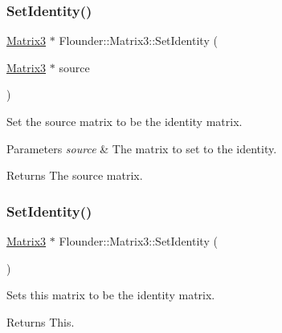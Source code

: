 \subsubsection{\texorpdfstring{Set\+Identity()}{SetIdentity()}\hspace{0.1cm}{\footnotesize\ttfamily [1/2]}}
{\footnotesize\ttfamily \hyperlink{class_flounder_1_1_matrix3}{Matrix3} $\ast$ Flounder\+::\+Matrix3\+::\+Set\+Identity (\begin{DoxyParamCaption}\item[{\hyperlink{class_flounder_1_1_matrix3}{Matrix3} $\ast$}]{source }\end{DoxyParamCaption})\hspace{0.3cm}{\ttfamily [static]}}



Set the source matrix to be the identity matrix. 


\begin{DoxyParams}{Parameters}
{\em source} & The matrix to set to the identity. \\
\hline
\end{DoxyParams}
\begin{DoxyReturn}{Returns}
The source matrix. 
\end{DoxyReturn}
\mbox{\label{class_flounder_1_1_matrix3_a518acfa7508d099ceb8eb298cdec0b35}} 
\subsubsection{\texorpdfstring{Set\+Identity()}{SetIdentity()}\hspace{0.1cm}{\footnotesize\ttfamily [2/2]}}
{\footnotesize\ttfamily \hyperlink{class_flounder_1_1_matrix3}{Matrix3} $\ast$ Flounder\+::\+Matrix3\+::\+Set\+Identity (\begin{DoxyParamCaption}{ }\end{DoxyParamCaption})}



Sets this matrix to be the identity matrix. 

\begin{DoxyReturn}{Returns}
This. 
\end{DoxyReturn}
\mbox{\label{class_flounder_1_1_matrix3_adc1f06f22bf3369ac4e6111392de5ef0}} 
